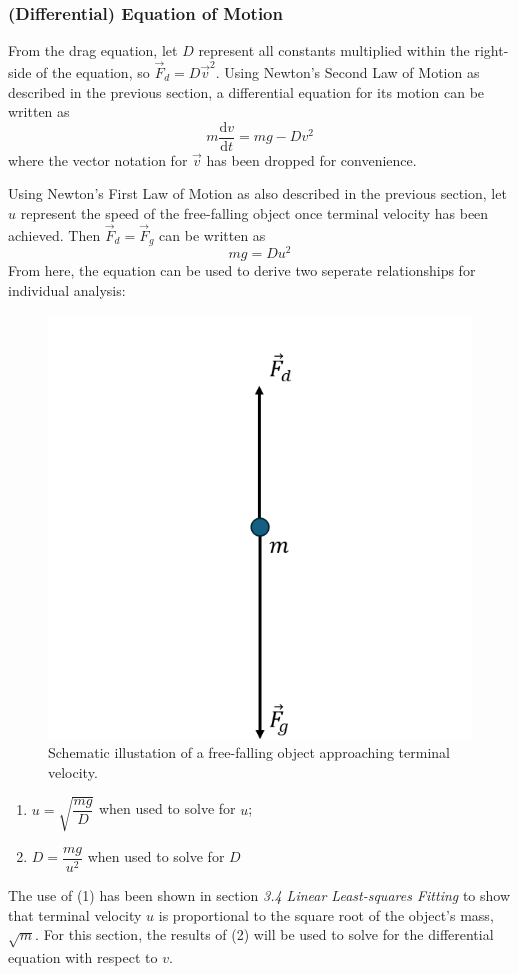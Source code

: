 \documentclass[12pt]{article}
\newcommand{\totder}[2][]{\frac{\mathrm{d}#1}{\mathrm{d}#2}} %
\newcommand{\dragforce}{\vec{F}_d}
\newcommand{\forceofgravity}{\vec{F}_g}
\begin{document}
\begin{multicols}{2}
\subsubsection{(Differential) Equation of Motion}
From the drag equation, let $D$ represent all constants multiplied within the right-side of the equation, so $\dragforce=D\vec{v}^2$.
Using Newton's Second Law of Motion as described in the previous section,
a differential equation for its motion can be written as
$$m\totder[v]{t}=mg-Dv^2$$
where the vector notation for $\vec{v}$ has been dropped for convenience.

Using Newton's First Law of Motion as also described in the previous section,
let $u$ represent the speed of the free-falling object once terminal velocity has been achieved.
Then $\dragforce=\forceofgravity$ can be written as
$$mg=Du^2$$
From here, the equation can be used to derive two seperate relationships for individual analysis:
\begin{figure}[H]
    \centering
    \includegraphics[width=0.98\linewidth]{figs/figure1.png}
    \caption{Schematic illustation of a free-falling object approaching terminal velocity.}
    \label{fig:1}
\end{figure}
    \begin{enumerate}[label=(\arabic*)]
        \item $u=\sqrt{\dfrac{mg}{D}}$ when used to solve for $u$;
        \item $D=\dfrac{mg}{u^2}$ when used to solve for $D$
    \end{enumerate}
The use of (1) has been shown in section \textit{3.4 Linear Least-squares Fitting} to show that terminal velocity $u$ is proportional to the square root of the object's mass, $\sqrt{m}$.
For this section, the results of (2) will be used to solve for the differential equation with respect to $v$.


\end{multicols}
\end{document}
